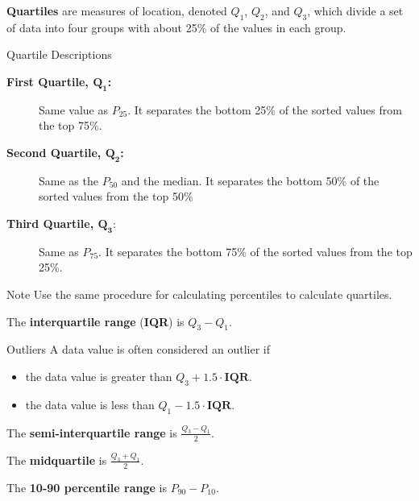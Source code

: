 \documentclass{beamer}
\begin{document}
\begin{frame}
\begin{definition}
\textbf{Quartiles} are measures of location, denoted $Q_1$, $Q_2$, and $Q_3$, which divide a set of data into four groups with about 25\% of the values in each group.
\end{definition}\pause

\begin{block}{Quartile Descriptions}
\begin{description}
\item[\textbf{First Quartile, $\boldsymbol{Q_1}$:}] Same value as $P_{25}$. It separates the bottom 25\% of the sorted values from the top 75\%.\pause
\item[\textbf{Second Quartile, $\boldsymbol{Q_2}$:}] Same as the $P_{50}$ and the median. It separates the bottom 50\% of the sorted values from the top 50\%\pause
\item[\textbf{Third Quartile, $\boldsymbol{Q_3}$}:] Same as $P_{75}$. It separates the bottom 75\% of the sorted values from the top 25\%.
\end{description}
\end{block}\pause

\begin{block}{Note}
Use the same procedure for calculating percentiles to calculate quartiles.
\end{block}
\end{frame}

\begin{frame}
\begin{definition}
The \textbf{interquartile range} (\textbf{IQR}) is $Q_3-Q_1$.
\end{definition}\pause

\begin{block}{Outliers}
A data value is often considered an outlier if
\begin{itemize}
\item  the data value is greater than $Q_3 + 1.5\cdot\textbf{IQR}$.
\item  the data value is less than $Q_1 - 1.5\cdot\textbf{IQR}$.
\end{itemize}
\end{block}\pause

\begin{definition}
The \textbf{semi-interquartile range} is $\tfrac{Q_3-Q_1}{2}$.
\end{definition}\pause

\begin{definition}
The \textbf{midquartile} is $\tfrac{Q_3+Q_1}{2}$.
\end{definition}\pause

\begin{definition}
The \textbf{10-90 percentile range} is $P_{90}-P_{10}$.
\end{definition}
\end{frame}
\end{document}
